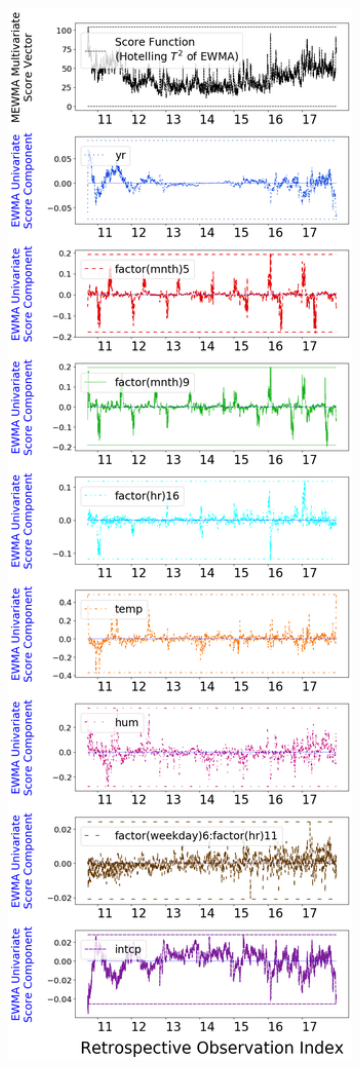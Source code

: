 \documentclass[twoside,11pt]{article}
\begin{document}
\begin{figure}[H]
\centering
    \begin{subfigure}[t]{0.35\linewidth}
     \centering
         \includegraphics[width=1.0\textwidth, trim=.0in .0in .0in .0in, clip]{../figures/v14/bike_sharing/reg_lin_A/quadr/PII_pos_single_retro_bike_fisher_mlines_with_regu_1e-08_0_0001_0_01_99_99.png}

\end{subfigure}
\end{figure}
\end{document}
